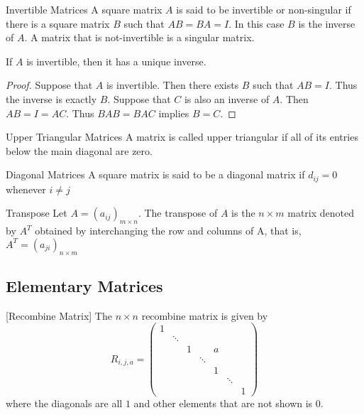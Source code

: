\documentclass[a4paper]{article}
\begin{document}
\begin{defn}{Invertible Matrices}{} A square matrix $A$ is said to be invertible or non-singular if there is a square matrix $B$ such that $AB=BA=I$. In this case $B$ is the inverse of $A$. A matrix that is not-invertible is a singular matrix. 
\end{defn}

\begin{thm}{}{} If $A$ is invertible, then it has a unique inverse. 
\end{thm}
\begin{proof} Suppose that $A$ is invertible. Then there exists $B$ such that $AB=I$. Thus the inverse is exactly $B$. Suppose that $C$ is also an inverse of $A$. Then $AB=I=AC$. Thus $BAB=BAC$ implies $B=C$. 
\end{proof}

\begin{defn}{Upper Triangular Matrices}{} A matrix is called upper triangular if all of its entries below the main diagonal are zero. 
\end{defn}

\begin{defn}{Diagonal Matrices}{} A square matrix is said to be a diagonal matrix if $d_{ij}=0$ whenever $i\neq j$
\end{defn}

\begin{defn}{Transpose}{} Let $A=(a_{ij})_{m\times n}$.  The transpose of $A$ is the $n\times m$ matrix denoted by $A^T$ obtained by interchanging the row and columns of A, that is, $A^T=(a_{ji})_{n\times m}$
\end{defn}

\subsection{Elementary Matrices}
\begin{defn}{}{}[Recombine Matrix] The $n\times n$ recombine matrix is given by $$R_{i,j,a}=
\begin{pmatrix}
1&&&&&&\\
&\ddots&&&&&\\
&&1&&a&&\\
&&&\ddots&&&\\
&&&&1&&\\
&&&&&\ddots&\\
&&&&&&1
\end{pmatrix}$$ where the diagonals are all $1$ and other elements that are not shown is $0$.
\end{defn}
\end{document}
